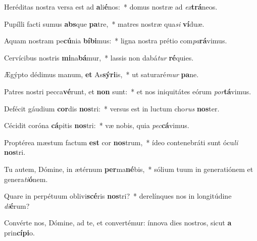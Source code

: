 \item Heréditas nostra versa est ad \textbf{a}li\textbf{é}nos:~* domus nostræ ad \textit{ex}\textbf{trá}neos.
\item Pupílli facti sumus \textbf{abs}que \textbf{pa}tre,~* matres nostræ qua\textit{si} \textbf{ví}duæ.
\item Aquam nostram pe\textbf{cú}nia \textbf{bí}\textbf{bi}mus:~* ligna nostra prétio com\textit{pa}\textbf{rá}vimus.
\item Cervícibus nostris \textbf{mi}na\textbf{bá}mur,~* lassis non dabá\textit{tur} \textbf{ré}quies.
\item Ægýpto dédimus manum, \textbf{et} As\textbf{sý}\textbf{ri}is,~* ut saturaré\textit{mur} \textbf{pa}ne.
\item Patres nostri pecca\textbf{vé}runt, et \textbf{non} sunt:~* et nos iniquitátes eórum \textit{por}\textbf{tá}vimus.
\item Defécit gáudium \textbf{cor}dis \textbf{nos}tri:~* versus est in luctum cho\textit{rus} \textbf{nos}ter.
\item Cécidit coróna \textbf{cá}pitis \textbf{nos}tri:~* væ nobis, quia \textit{pec}\textbf{cá}vimus.
\item Proptérea mæstum factum \textbf{est} cor \textbf{nos}trum,~* ídeo contenebráti sunt ócu\textit{li} \textbf{nos}tri.
\item Tu autem, Dómine, in ætérnum \textbf{per}ma\textbf{né}bis,~* sólium tuum in generatiónem et genera\textit{ti}\textbf{ó}nem.
\item Quare in perpétuum oblivi\textbf{scé}ris \textbf{nos}tri?~* derelínques nos in longitúdine \textit{di}\textbf{é}rum?
\item Convérte nos, Dómine, ad te, et convertémur: ínnova dies nostros, sicut \textbf{a} prin\textbf{cí}\textbf{pi}o.
